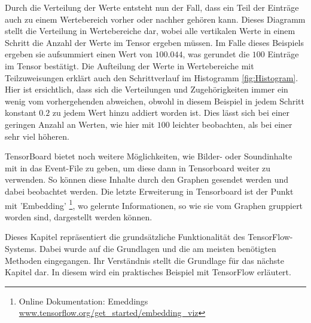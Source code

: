 Durch die Verteilung der Werte entsteht nun der Fall, dass ein Teil der Einträge auch zu einem Wertebereich vorher oder nachher gehören kann. 
Dieses Diagramm stellt die Verteilung in Wertebereiche dar, wobei alle vertikalen Werte in einem Schritt die Anzahl der Werte im Tensor ergeben müssen. 
Im Falle dieses Beispiels ergeben sie aufsummiert einen Wert von $100.044$, was gerundet die $100$ Einträge im Tensor bestätigt. 
Die Aufteilung der Werte in Wertebereiche mit Teilzuweisungen erklärt auch den Schrittverlauf im Histogramm \ref{fig:Histogram}. 
Hier ist ersichtlich, dass sich die Verteilungen und Zugehörigkeiten immer ein wenig vom vorhergehenden abweichen, obwohl in diesem Beispiel in jedem Schritt konstant $0.2$ zu jedem Wert hinzu addiert worden ist. 
Dies lässt sich bei einer geringen Anzahl an Werten, wie hier mit $100$ leichter beobachten, als bei einer sehr viel höheren. \phantom \newline

\noindent
TensorBoard bietet noch weitere Möglichkeiten, wie Bilder- oder Soundinhalte mit in das Event-File zu geben, um diese dann in Tensorboard weiter zu verwenden. 
So können diese Inhalte durch den Graphen gesendet werden und dabei beobachtet werden. 
Die letzte Erweiterung in Tensorboard ist der Punkt mit 'Embedding' \footnote{Online Dokumentation: Emeddings \url{www.tensorflow.org/get_started/embedding_viz}}, wo gelernte Informationen, so wie sie vom Graphen gruppiert worden sind, dargestellt werden können.  \phantom \newline

\noindent
Dieses Kapitel repräsentiert die grundsätzliche Funktionalität des TensorFlow-Systems. 
Dabei wurde auf die Grundlagen und die am meisten benötigten Methoden eingegangen. 
Ihr Verständnis stellt die Grundlage für das nächste Kapitel dar. 
In diesem wird ein praktisches Beispiel mit TensorFlow erläutert. 








